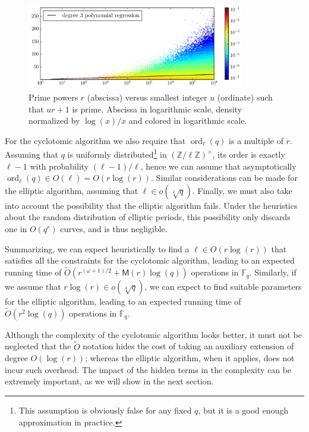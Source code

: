 \documentclass{mcom-l}
\theoremstyle{plain}
\theoremstyle{definition}
\newcommand{\tildO}{\tilde{O}}
\DeclareMathOperator{\order}{ord} %
\newcommand{\Z}{\ensuremath{\mathbb{Z}}}
\newcommand{\F}{\ensuremath{\mathbb{F}}}
\newcommand{\MM}{\ensuremath{\mathsf{M}}}
\newcounter{algorithm}
\begin{document}
\begin{figure}
  \centering
  \includegraphics[width=0.85\textwidth]{plots/arith_prog}
  \caption{Prime powers $r$ (abscissa) versus smallest integer $u$
    (ordinate) such that $ur+1$ is prime. Abscissa in logarithmic
    scale, density normalized by $\log(x)/x$ and colored in
    logarithmic scale.}
  \label{fig:primes-arith-prog}
\end{figure}

For the cyclotomic algorithm we also require that $\order_\ell(q)$ is
a multiple of $r$. Assuming that $q$ is uniformly
distributed\footnote{This assumption is obviously false for any fixed
  $q$, but it is a good enough approximation in practice.} in
$(\Z/\ell\Z)^\times$, its order is exactly $\ell-1$ with probability
$(\ell-1)/\ell$, hence we can assume that asymptotically
$\order_\ell(q)\in O(\ell)=O(r\log(r))$. Similar considerations can be
made for the elliptic algorithm, assuming that $\ell\in
o(\sqrt[4]{q})$.
Finally, we must also take into account the possibility that the
elliptic algorithm fails. Under the heuristics about
the random distribution of elliptic periods,
this possibility only discards one in
$O(q^r)$ curves, and is thus negligible.


Summarizing, we can expect heuristically to find a
$\ell\in O(r\log(r))$ that satisfies all the constraints for the
cyclotomic algorithm, leading to an expected running time of
$\tildO(r^{(\omega+1)/2}+\MM(r)\log(q))$ operations in $\F_q$.  %
Similarly, if we assume that $r\log(r)\in o(\sqrt[4]{q})$, we can
expect to find suitable parameters for the elliptic algorithm, leading
to an expected running time of $\tildO(r^2\log(q))$ operations in
$\F_q$.

Although the complexity of the cyclotomic algorithm looks better, it
must not be neglected that the $\tildO$ notation
hides the cost of taking an auxiliary extension of degree
$O(\log(r))$; whereas the elliptic algorithm, when it applies, does
not incur such overhead. The impact of the hidden terms in the
complexity can be extremely important, as we will show in the next
section. 
\end{document}
